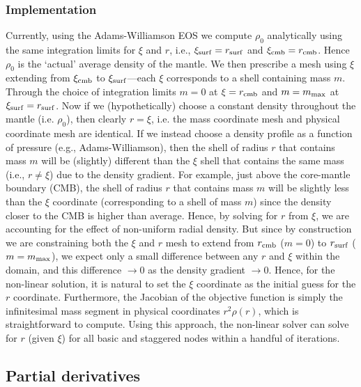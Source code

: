 \subsubsection{Implementation}
Currently, using the Adams-Williamson EOS we compute $\rho_0$ analytically using the same integration limits for $\xi$ and $r$, i.e., $\xi_{\rm surf}=r_{\rm surf}$ and $\xi_{\rm cmb}=r_{\rm cmb}$.  Hence $\rho_0$ is the `actual' average density of the mantle.  We then prescribe a mesh using $\xi$ extending from $\xi_{\rm cmb}$ to $\xi_{\rm surf}$---each $\xi$ corresponds to a shell containing mass $m$.  Through the choice of integration limits $m=0$ at $\xi=r_{\rm cmb}$ and $m=m_{\rm max}$ at $\xi_{\rm surf}=r_{\rm surf}$.  Now if we (hypothetically) choose a constant density throughout the mantle (i.e. $\rho_0$), then clearly $r=\xi$, i.e. the mass coordinate mesh and physical coordinate mesh are identical.  If we instead choose a density profile as a function of pressure (e.g., Adams-Williamson), then the shell of radius $r$ that contains mass $m$ will be (slightly) different than the $\xi$ shell that contains the same mass (i.e., $r \neq \xi$) due to the density gradient.  For example, just above the core-mantle boundary (CMB), the shell of radius $r$ that contains mass $m$ will be slightly less than the $\xi$ coordinate (corresponding to a shell of mass $m$) since the density closer to the CMB is higher than average.  Hence, by solving for $r$ from $\xi$, we are accounting for the effect of non-uniform radial density.  But since by construction we are constraining both the $\xi$ and $r$ mesh to extend from $r_{\rm cmb}$ ($m=0$) to $r_{\rm surf}$ ($m=m_{\rm max}$), we expect only a small difference between any $r$ and $\xi$ within the domain, and this difference $\rightarrow 0$ as the density gradient $\rightarrow 0$.  Hence, for the non-linear solution, it is natural to set the $\xi$ coordinate as the initial guess for the $r$ coordinate.  Furthermore, the Jacobian of the objective function is simply the infinitesimal mass segment in physical coordinates $r^2 \rho(r)$, which is straightforward to compute.  Using this approach, the non-linear solver can solve for $r$ (given $\xi$) for all basic and staggered nodes within a handful of iterations.
\subsection{Partial derivatives}
\\

